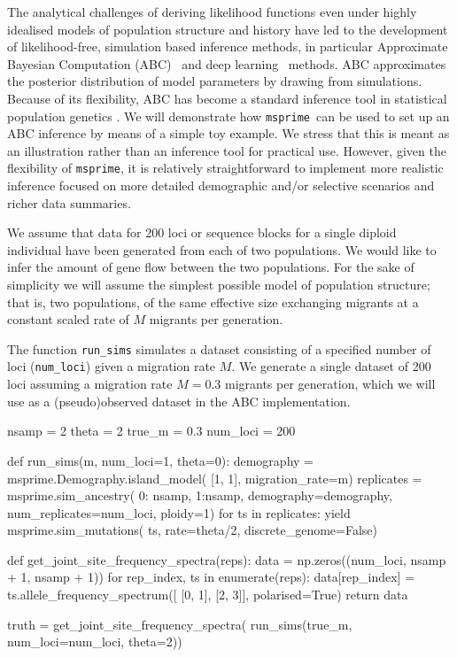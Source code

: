 \documentclass[graybox]{svmult}
\newcommand{\msprime}[0]{\texttt{msprime}}
\begin{document}
The analytical challenges of deriving likelihood functions even under
highly idealised models of population structure and history have led to
the development of likelihood-free, simulation based inference methods, in particular
Approximate Bayesian Computation (ABC)~\citep{Beaumont2002} and deep learning~\cite{korfmann2023deep} methods.
ABC approximates the posterior distribution of model parameters by drawing from
simulations. Because of its flexibility, ABC has become a standard
inference tool in statistical population genetics \citep[see][for a review]{csillery2010approximate}.
We will demonstrate how \msprime\ can be used to set up an ABC inference
by means of a simple toy example. We stress that this is meant as an
illustration rather than an inference tool for practical use. However,
given the flexibility of \msprime, it is
relatively straightforward to implement more realistic inference focused
on more detailed demographic and/or selective scenarios and richer data summaries.

We assume that data for 200 loci or sequence blocks
for a single diploid individual have been generated
from each of two populations. We would like to infer the amount of gene
flow between the two populations. For the sake of simplicity we will
assume the simplest possible model of population structure; that is, two
populations, of the same effective size exchanging migrants at a
constant scaled rate of \(M\) migrants per generation.

The function \texttt{run\_sims} simulates a dataset consisting of a
specified number of loci (\texttt{num\_loci}) given a migration rate
\(M\). We generate a single dataset of 200 loci assuming a migration rate
\(M=0.3\) migrants per generation, which we will use as a (pseudo)observed dataset in the ABC
implementation.

\begin{pythoncode}
nsamp = 2
theta = 2
true_m = 0.3
num_loci = 200

def run_sims(m, num_loci=1, theta=0):
    demography = msprime.Demography.island_model(
        [1, 1], migration_rate=m)
    replicates = msprime.sim_ancestry(
        {0: nsamp, 1:nsamp}, demography=demography,
        num_replicates=num_loci, ploidy=1)
    for ts in replicates:
        yield msprime.sim_mutations(
            ts, rate=theta/2, discrete_genome=False)

def get_joint_site_frequency_spectra(reps):
    data = np.zeros((num_loci, nsamp + 1, nsamp + 1))
    for rep_index, ts in enumerate(reps):
        data[rep_index] = ts.allele_frequency_spectrum([
            [0, 1], [2, 3]], polarised=True)
    return data

truth = get_joint_site_frequency_spectra(
    run_sims(true_m, num_loci=num_loci, theta=2))
\end{pythoncode}
\end{document}

